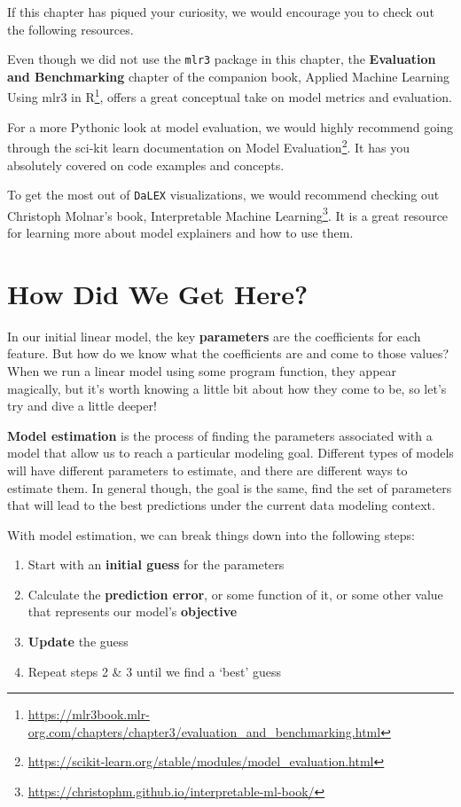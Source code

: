 \documentclass[
  letterpaper,
]{krantz}
\providecommand{\tightlist}{%
  \setlength{\itemsep}{0pt}\setlength{\parskip}{0pt}}\usepackage{longtable,booktabs,array}
\DeclareRobustCommand{\href}[2]{#2\footnote{\url{#1}}}
\begin{document}
If this chapter has piqued your curiosity, we would encourage you to
check out the following resources.

Even though we did not use the \texttt{mlr3} package in this chapter,
the \textbf{Evaluation and Benchmarking} chapter of the companion book,
\href{https://mlr3book.mlr-org.com/chapters/chapter3/evaluation_and_benchmarking.html}{Applied
Machine Learning Using mlr3 in R}, offers a great conceptual take on
model metrics and evaluation.

For a more Pythonic look at model evaluation, we would highly recommend
going through the sci-kit learn documentation on
\href{https://scikit-learn.org/stable/modules/model_evaluation.html}{Model
Evaluation}. It has you absolutely covered on code examples and
concepts.

To get the most out of \texttt{DaLEX} visualizations, we would recommend
checking out Christoph Molnar's book,
\href{https://christophm.github.io/interpretable-ml-book/}{Interpretable
Machine Learning}. It is a great resource for learning more about model
explainers and how to use them.

\chapter{How Did We Get Here?}\label{sec-estimation}

In our initial linear model, the key \textbf{parameters} are the
coefficients for each feature. But how do we know what the coefficients
are and come to those values? When we run a linear model using some
program function, they appear magically, but it's worth knowing a little
bit about how they come to be, so let's try and dive a little deeper!

\textbf{Model estimation} is the process of finding the parameters
associated with a model that allow us to reach a particular modeling
goal. Different types of models will have different parameters to
estimate, and there are different ways to estimate them. In general
though, the goal is the same, find the set of parameters that will lead
to the best predictions under the current data modeling context.

With model estimation, we can break things down into the following
steps:

\begin{enumerate}
\def\labelenumi{\arabic{enumi}.}
\tightlist
\item
  Start with an \textbf{initial guess} for the parameters
\item
  Calculate the \textbf{prediction error}, or some function of it, or
  some other value that represents our model's \textbf{objective}
\item
  \textbf{Update} the guess
\item
  Repeat steps 2 \& 3 until we find a `best' guess
\end{enumerate}
\end{document}
